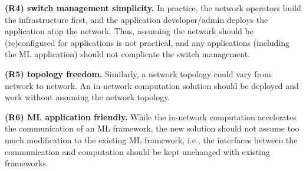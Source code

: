 \textbf{(R4) switch management simplicity.} In practice, the network operators build the infrastructure first, and the application developer/admin deploys the application atop the network. Thus, assuming the network should be (re)configured for applications is not practical, and any applications (including the ML application) should not complicate the switch management.

\textbf{(R5) topology freedom.} Similarly, a network topology could vary from network to network. An in-network computation solution should be deployed and work without assuming the network topology.

\textbf{(R6) ML application friendly.} While the in-network computation accelerates the communication of an ML framework, the new solution should not assume too much modification to the existing ML framework, i.e., the interfaces between the communication and computation should be kept unchanged with existing frameworks.


















